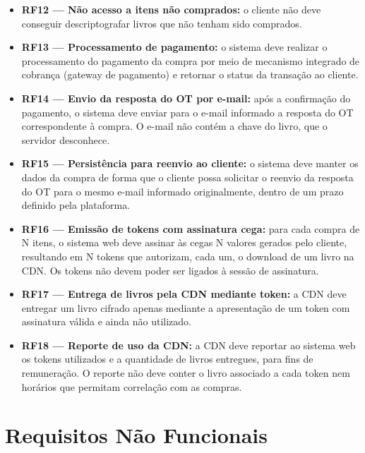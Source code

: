 \begin{itemize}
\item \textbf{RF12 --- Não acesso a itens não comprados:} o cliente não deve
conseguir descriptografar livros que não tenham sido comprados.

\item \textbf{RF13 --- Processamento de pagamento:} o sistema deve realizar o
processamento do pagamento da compra por meio de mecanismo integrado de
cobrança (gateway de pagamento) e retornar o status da transação ao cliente.

\item \textbf{RF14 --- Envio da resposta do OT por e-mail:} após a confirmação
do pagamento, o sistema deve enviar para o e-mail informado a resposta do OT
correspondente à compra. O e-mail não contém a chave do livro, que o servidor
desconhece.

\item \textbf{RF15 --- Persistência para reenvio ao cliente:} o sistema deve
manter os dados da compra de forma que o cliente possa solicitar o reenvio da
resposta do OT para o mesmo e-mail informado originalmente, dentro de um prazo
definido pela plataforma.

\item \textbf{RF16 --- Emissão de tokens com assinatura cega:} para cada
compra de N itens, o sistema web deve assinar às cegas N valores gerados pelo
cliente, resultando em N tokens que autorizam, cada um, o download de um livro
na CDN. Os tokens não devem poder ser ligados à sessão de assinatura.

\item \textbf{RF17 --- Entrega de livros pela CDN mediante token:} a CDN deve
entregar um livro cifrado apenas mediante a apresentação de um token com
assinatura válida e ainda não utilizado.

\item \textbf{RF18 --- Reporte de uso da CDN:} a CDN deve reportar ao sistema
web os tokens utilizados e a quantidade de livros entregues, para fins de
remuneração. O reporte não deve conter o livro associado a cada token nem
horários que permitam correlação com as compras.
\end{itemize}

\section{Requisitos Não Funcionais}

